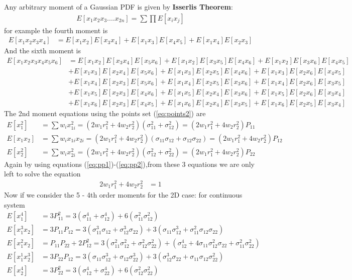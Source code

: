 \documentclass{article}
\begin{document}
 Any arbitrary moment of a Gaussian PDF is given by {\bf Isserlis Theorem}:
 \begin{align}
 E[x_1x_2x_3....x_{2n}]=\sum\prod{E[x_ix_j]}
 \end{align} 
 for example the fourth moment is
 \begin{align}
 E[x_1x_2x_3x_4]&=E[x_1x_2]E[x_3x_4]+E[x_1x_3]E[x_4x_5]+E[x_1x_4]E[x_2x_3]
 \end{align}
 And the sixth moment is
 \begin{align*}
 E[x_1x_2x_3x_4x_5x_6]&=E[x_1x_2]E[x_3x_4]E[x_5x_6]    +E[x_1x_2]E[x_3x_5]E[x_4x_6]		+E[x_1x_2]E[x_3x_6]E[x_4x_5]\\
 &+E[x_1x_3]E[x_2x_4]E[x_5x_6]    +E[x_1x_3]E[x_2x_5]E[x_4x_6]		+E[x_1x_3]E[x_2x_6]E[x_4x_5]\\
 &+E[x_1x_4]E[x_2x_3]E[x_5x_6]		+E[x_1x_4]E[x_2x_5]E[x_3x_6]		+E[x_1x_4]E[x_2x_6]E[x_3x_5]\\
 &+E[x_1x_5]E[x_2x_3]E[x_4x_6]		+E[x_1x_5]E[x_2x_4]E[x_3x_6]		+E[x_1x_5]E[x_2x_6]E[x_3x_4]\\
 &+E[x_1x_6]E[x_2x_3]E[x_4x_5]		+E[x_1x_6]E[x_2x_4]E[x_3x_5]		+E[x_1x_6]E[x_2x_5]E[x_3x_4]
 \end{align*}
 The 2nd moment equations using the points set (\ref{eq:points2}) are
 \begin{align} E[x_1^2]&=\sum{w_ix_{1i}^2}=(2w_1r_1^2+4w_2r_2^2)(\sigma_{11}^2+\sigma_{12}^2)=(2w_1r_1^2+4w_2r_2^2)P_{11}\\ E[x_1x_2]&=\sum{w_ix_{1i}x_{2i}}=(2w_1r_1^2+4w_2r_2^2)(\sigma_{11}\sigma_{12}+\sigma_{12}\sigma_{22})=(2w_1r_1^2+4w_2r_2^2)P_{12}\\
E[x_2^2]&=\sum{w_ix_{2i}^2}=(2w_1r_1^2+4w_2r_2^2)(\sigma_{12}^2+\sigma_{22}^2)=(2w_1r_1^2+4w_2r_2^2)P_{22}
 \end{align} 
  Again by using equations (\ref{eq:pp1})-(\ref{eq:pp2}),from these 3 equations we are only left to solve the equation
 \begin{align}
 2w_1r_1^2+4w_2r_2^2&=1
 \end{align}
 Now if we consider the 5 - 4th order moments for the 2D case: \newline\newline
 for continuous system
 \begin{align*}
 E[x_1^4]&=3 P_{11}^2=3 (\sigma_{11}^4 + \sigma_{12}^4) + 6 (\sigma_{11}^2 \sigma_{12}^2)\\
 E[x_1^3x_2]&=3 P_{11} P_{12}=3 (\sigma_{11}^3 \sigma_{12}+ \sigma_{12}^3 \sigma_{22}) + 3( \sigma_{11} \sigma_{12}^3 +  \sigma_{11}^2 \sigma_{12} \sigma_{22}) \\
 E[x_1^2x_2]&=P_{11} P_{22} + 2 P_{12}^2=3 (\sigma_{11}^2 \sigma_{12}^2+ \sigma_{12}^2 \sigma_{22}^2  ) + (\sigma_{12}^4 + 4 \sigma_{11} \sigma_{12}^2 \sigma_{22} + \sigma_{11}^2 \sigma_{22}^2) \\
 E[x_1^1x_2^3]&=3 P_{22} P_{12}=3 (\sigma_{11} \sigma_{12}^3+  \sigma_{12} \sigma_{22}^3) + 3( \sigma_{12}^3 \sigma_{22} +  \sigma_{11} \sigma_{12} \sigma_{22}^2) \\
 E[x_2^4]&=3 P_{22}^2=3 (\sigma_{12}^4+  \sigma_{22}^4 )+ 6 (\sigma_{12}^2 \sigma_{22}^2 )
 \end{align*}
\end{document}
